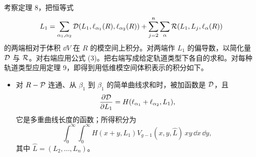 考察定理 8，把恒等式
\[
L_1=\sum_{\alpha_1,\alpha_2}\mathcal{D}(L_1,\ell_{\alpha_1}(R),\ell_{\alpha_2}(R))
+\sum_{j=2}^n\sum_{\alpha}\mathcal{R}(L_1,L_j,\ell_\alpha(R))
\]
的两端相对于体积 $\dd V$ 在 $R$ 的模空间上积分。对两端作 $L_1$ 的偏导数，以简化量 $\mathcal{D}$ 与 $\mathcal{R}$。对右端应用公式 (3)。把右端写成给定轨道类型下各自的求和。对每种轨道类型应用定理 9，即得到用低维模空间体积表示的积分如下。
\begin{itemize}[leftmargin=1.6em,itemsep=2pt,topsep=2pt]
\item 对 $R-\mathcal{P}$ 连通、从 $\beta_1$ 到 $\beta_1$ 的简单曲线求和时，被加函数是 $\mathcal{D}$，且
\[
\frac{\partial\mathcal{D}}{\partial L_1}=H(\ell_{\alpha_1}+\ell_{\alpha_2},L_1),
\]
它是多重曲线长度的函数；所得积分为
\[
\int_0^\infty\int_0^\infty H(x+y,L_1)V_{g-1}(x,y,\widehat{L})\,x y\,\dd x\,\dd y,
\]
其中 $\widehat{L}=(L_2,\ldots,L_n)$。
\end{itemize}
